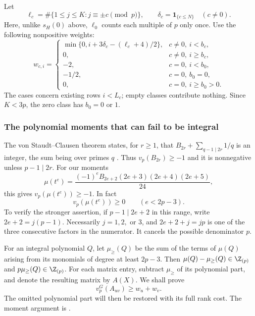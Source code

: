 Let
\[
 \ell_c=\#\{1\le j\le K:j\equiv\pm c\pmod p\},
 \qquad \delta_c=\mathbf1_{\{c\le N\}}\quad(c\ne0).
\]
Here, unlike $s_H(0)$ above, $\ell_0$ counts each multiple of $p$
only once. Use the following nonpositive weights:
\begin{equation}\label{arith:outerweights}
 w_{c,i}=
 \begin{cases}
 \min\{0,i+3\delta_c-(\ell_c+4)/2\},&c\ne0,\ i<b_c,\\
 0,&c\ne0,\ i\ge b_c,\\
 -2,&c=0,\ i<b_0,\\
 -1/2,&c=0,\ b_0=0,\\
 0,&c=0,\ i\ge b_0>0.
 \end{cases}
\end{equation}
The cases concern existing rows $i<L_c$; empty classes contribute nothing.
Since $K<3p$, the zero class has $b_0=0$ or $1$.

\subsubsection*{The polynomial moments that can fail to be integral}

The von Staudt--Clausen theorem states, for $r\ge1$, that
$B_{2r}+\sum_{q-1\mid2r}1/q$ is an integer, the sum being over
primes $q$ \cite[24.10(i)]{dlmf}.
Thus $v_p(B_{2r})\ge-1$ and it is nonnegative unless
$p-1\mid2r$. For our moments
\[
 \mu(t^e)=\frac{(-1)^eB_{2e+2}(2e+3)(2e+4)(2e+5)}{24},
\]
this gives $v_p(\mu(t^e))\ge-1$. In fact
\begin{equation}\label{arith:low-moments}
 v_p(\mu(t^e))\ge0\qquad(e<2p-3).
\end{equation}
To verify the stronger assertion, if $p-1\mid2e+2$ in this range,
write $2e+2=j(p-1)$. Necessarily $j=1,2,$ or $3$, and
$2e+2+j=jp$ is one of the three consecutive factors in the numerator.
It cancels the possible denominator $p$.

For an integral polynomial $Q$, let $\mu_{\ge}(Q)$ be the sum of
the terms of $\mu(Q)$ arising from its monomials of degree at least
$2p-3$. Then
$\mu(Q)-\mu_{\ge}(Q)\in\Z_{(p)}$ and
$p\mu_{\ge}(Q)\in\Z_{(p)}$.
For each matrix entry, subtract $\mu_{\ge}$ of its polynomial part,
and denote the resulting matrix by $A(X)$. We shall prove
\begin{equation}\label{arith:outer-entry}
 v_p^G(A_{uv})\ge w_u+w_v.
\end{equation}
The omitted polynomial part will then be restored with its full
rank cost. The moment argument is
\cite[\texttt{MomentVal.lean}, \texttt{OuterFrame.lean}]{firsching}.

